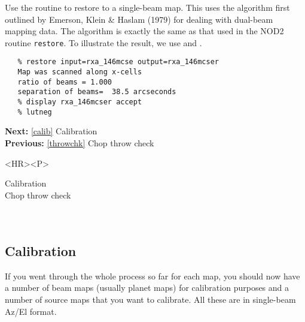    Use the routine
{\tt {}}
   to restore to a single-beam map. This uses the algorithm first outlined by
\htmltex{\ref{reference}}Emerson, Klein \& Haslam (1979){}
   for dealing with dual-beam mapping data. The algorithm is exactly the
   same as that used in the NOD2 routine {\tt restore}. To illustrate
   the result, we use
{\tt {}}
   and
{\tt {}}.

\begin{verbatim}
   % restore input=rxa_146mcse output=rxa_146mcser
   Map was scanned along x-cells
   ratio of beams = 1.000
   separation of beams=  38.5 arcseconds
   % display rxa_146mcser accept
   % lutneg
\end{verbatim}

\begin{latexonly}
\begin{center}
\leavevmode\epsfysize=80mm
\end{center}
\end{latexonly}

\begin{latexonly}
{\bf Next:} \ref{calib} Calibration\\
{\bf Previous:} \ref{throwchk} Chop throw check\\
\end{latexonly}

\begin{htmlonly}
\begin{rawhtml} <HR><P> \end{rawhtml}
{\bf {}} Calibration\\
{\bf {}} Chop throw check\\
{\bf {}}\\
{\bf {}}\\
\end{htmlonly}


\subsection{\label{calib}Calibration}

   If you went through the whole process so far for each map, you should
   now have a number of beam maps (usually planet maps) for calibration
   purposes and a number of source maps that you want to calibrate. All
   these are in single-beam Az/El format.

